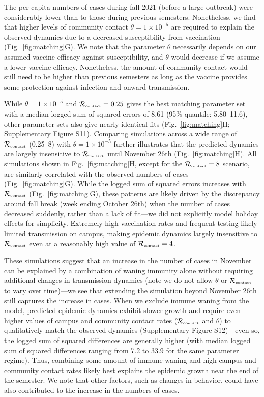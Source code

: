 \documentclass[12pt]{article}
\newcommand{\fref}[1]{Fig.~\ref{fig:#1}}
\newcommand{\Rx}[1]{\ensuremath{{\mathcal R}_{#1}}}
\newcommand{\Rc}{\Rx{\textrm{\tiny{contact}}}}
\begin{document}
The per capita numbers of cases during fall 2021 (before a large outbreak) were considerably lower than to those during previous semesters.
Nonetheless, we find that higher levels of community contact $\theta=1 \times 10^{-5}$ are required to explain the observed dynamics due to a decreased susceptibility from vaccination (\fref{matching}G).
We note that the parameter $\theta$ necessarily depends on our assumed vaccine efficacy against susceptibility, and $\theta$ would decrease if we assume a lower vaccine efficacy.
Nonetheless, the amount of community contact would still need to be higher than previous semesters as long as the vaccine provides some protection against infection and onward transmission.

While $\theta = 1 \times 10^{-5}$ and $\Rc = 0.25$ gives the best matching parameter set with a median logged sum of squared errors of 8.61 (95\% quantile: 5.80--11.6), other parameter sets also give nearly identical fits (\fref{matching}H; Supplementary Figure S11).
Comparing simulations across a wide range of $\Rc$ (0.25--8) with $\theta = 1 \times 10^{-5}$ further illustrates that the predicted dynamics are largely insensitive to $\Rc$ until November 26th (\fref{matching}H).
All simulations shown in \fref{matching}H, except for the $\Rc=8$ scenario, are similarly correlated with the observed numbers of cases (\fref{matching}G). 
While the logged sum of squared errors increases with $\Rc$ (\fref{matching}G), these patterns are likely driven by the discrepancy around fall break (week ending October 26th) when the number of cases decreased suddenly, rather than a lack of fit---we did not explicitly model holiday effects for simplicity.
Extremely high vaccination rates and frequent testing likely limited transmission on campus, making epidemic dynamics largely insensitive to $\Rc$ even at a reasonably high value of $\Rc = 4$.

These simulations suggest that an increase in the number of cases in November can be explained by a combination of waning immunity alone without requiring additional changes in transmission dynamics (note we do not allow $\theta$ or $\Rc$ to vary over time)---we see that extending the simulation beyond November 26th still captures the increase in cases.
When we exclude immune waning from the model, predicted epidemic dynamics exhibit slower growth and require even higher values of campus and community contact rates ($\Rc$ and $\theta$) to qualitatively match the observed dynamics (Supplementary Figure S12)---even so, the logged sum of squared differences are generally higher (with median logged sum of squared differences ranging from 7.2 to 33.9 for the same parameter regime).
Thus, combining some amount of immune waning and high campus and community contact rates likely best explains the epidemic growth near the end of the semester.
We note that other factors, such as changes in behavior, could have also contributed to the increase in the numbers of cases.
\end{document}
